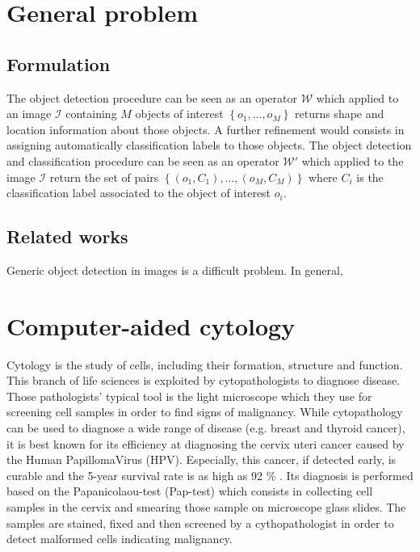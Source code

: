 \label{chap:context}
\section{General problem}
\subsection{Formulation}
The object detection procedure can be seen as an operator $\mathcal{W}$ which applied to an image $\mathcal{I}$ containing $M$ objects of interest $\left\{o_1,...,o_M\right\}$ returns shape and location information about those objects. A further refinement would consists in assigning automatically classification labels to those objects. The object detection and classification procedure can be seen as an operator $\mathcal{W}'$ which applied to the image $\mathcal{I}$ return the set of pairs $\left\{\left(o_1, C_1\right), ..., \left(o_M, C_M\right)\right\}$ where $C_i$ is the classification label associated to the object of interest $o_i$. 

\subsection{Related works}
Generic object detection in images is a difficult problem. In general, 



\section{Computer-aided cytology}
\label{sec:cadc}
Cytology is the study of cells, including their formation, structure and function. This branch of life sciences is exploited by cytopathologists to diagnose disease. Those pathologists' typical tool is the light microscope which they use for screening cell samples in order to find signs of malignancy. While cytopathology can be used to diagnose a wide range of disease (e.g. breast and thyroid cancer), it is best known for its efficiency at diagnosing the cervix uteri cancer caused by the Human PapillomaVirus (HPV). Especially, this cancer, if detected early, is curable and the 5-year survival rate is as high as 92 \% \cite{bengtsson2014screening}. Its diagnosis is performed based on the Papanicolaou-test (Pap-test) which consists in collecting cell samples in the cervix and smearing those sample on microscope glass slides. The samples are stained, fixed and then screened by a cythopathologist in order to detect malformed cells indicating malignancy. 

